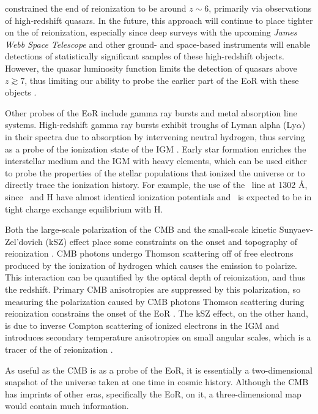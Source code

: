 \documentclass[12pt]{article}
\begin{document}
\cite{fan2006} constrained the end of reionization to be around $z \sim 6$, primarily via observations of high-redshift quasars. In the future, this approach will continue to place tighter  on the  of reionization, especially since deep surveys with the upcoming \textit{James Webb Space Telescope} and other ground- and space-based instruments will enable detections of statistically significant samples of these high-redshift objects. However, the quasar luminosity function limits the detection of quasars above $z \gtrsim 7$, thus limiting our ability to probe the earlier part of the EoR with these objects \citep{richards2006, hopkins2007}.

Other probes of the EoR include gamma ray bursts and metal absorption line systems. High-redshift gamma ray bursts exhibit troughs  of Lyman alpha (Ly$\alpha$) in their spectra due to absorption by intervening neutral hydrogen, thus serving as a probe of the ionization state of the IGM \citep[e.g.,][]{gallerani2008}. Early star formation enriches the interstellar medium and the IGM with heavy elements, which can be used either to probe the properties of the stellar populations that ionized the universe or to directly trace the ionization history. For example, \cite{oh2002}  the use of the \OI~line at 1302 \AA, since \OI~and H have almost identical ionization potentials and \OI~is expected to be in tight charge exchange equilibrium with H.

Both the large-scale polarization of the CMB and the small-scale kinetic Sunyaev-Zel'dovich (kSZ) effect place some constraints on the onset and topography of reionization \citep{fan2006}. CMB photons undergo Thomson scattering off of free electrons produced by the ionization of hydrogen which causes the emission to polarize. This interaction can be quantified by the optical depth of reionization, and thus the redshift. Primary CMB anisotropies are suppressed by this polarization, so measuring the polarization caused by CMB photons Thomson scattering during reionization constrains the onset of the EoR \citep[e.g.,][]{zaldarriaga1997, roy2018}. The kSZ effect, on the other hand, is due to inverse Compton scattering of ionized electrons in the IGM and introduces secondary temperature anisotropies on small angular scales, which is a tracer of the  of reionization \citep{fan2006, park2013, roy2018}.

As useful as the CMB is as a probe of the EoR, it is essentially a two-dimensional snapshot of the universe taken at one time in cosmic history. Although the CMB has imprints of other eras, specifically the EoR, on it, a three-dimensional map would contain much information. 
\end{document}
